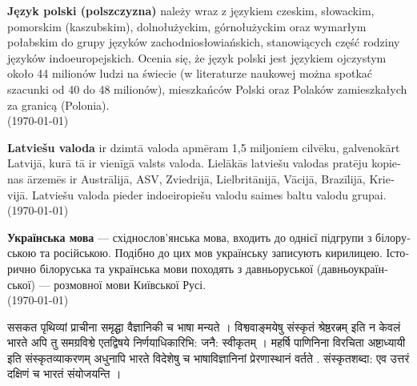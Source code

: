 \documentclass[a4paper]{article}
\begin{document}
\begin{polish}
\textbf{Język polski (polszczyzna)} należy wraz z językiem czeskim, słowackim, pomorskim (kaszubskim), dolnołużyckim, górnołużyckim oraz wymarłym połabskim do grupy języków zachodniosłowiańskich, stanowiących część rodziny języków indoeuropejskich. Ocenia się, że język polski jest językiem ojczystym około 44 milionów ludzi na świecie (w literaturze naukowej można spotkać szacunki od 40 do 48 milionów), mieszkańców Polski oraz Polaków zamieszkałych za granicą (Polonia).\\
(\today)
\end{polish}

\begin{latvian} 
\textbf{Latviešu valoda} ir dzimtā valoda apmēram 1,5 miljoniem cilvēku, galvenokārt Latvijā, kurā tā ir vienīgā valsts valoda. Lielākās latviešu valodas pratēju kopienas ārzemēs ir Austrālijā, ASV, Zviedrijā, Lielbritānijā, Vācijā, Brazīlijā, Krievijā. Latviešu valoda pieder indoeiropiešu valodu saimes baltu valodu grupai.\\
(\today)
\end{latvian}

\begin{ukrainian}
\textbf{Українська мова} — східнослов'янська мова, входить до однієї підгрупи з білоруською та російською. Подібно до цих мов українську записують кирилицею. Історично білоруська та українська мови походять з давньоруської (давньоукраїнської) — розмовної мови Київської Русі.\\
(\today)
\end{ukrainian}

\begin{sanskrit}
{\Large ससकत} पृथिव्यां प्राचीना समृद्घा वैज्ञानिकी च भाषा मन्यते । विश्ववाङ्‌मयेषु संस्कृतं श्रेष्ठरत्नम् इति न केवलं भारते अपि तु समग्रविश्वे एतद्विषये निर्णयाधिकारिभि: जनै: स्वीकृतम् । महर्षि पाणिनिना विरचिता अष्टाध्यायी इति संस्कृतव्याकरणम्‌ अधुनापि भारते विदेशेषु च भाषाविज्ञानिनां प्रेरणास्‍थानं वर्तते . संस्कृतशब्दा: एव उत्तरं दक्षिणं च भारतं संयोजयन्ति ।
\end{sanskrit}
\end{document}
